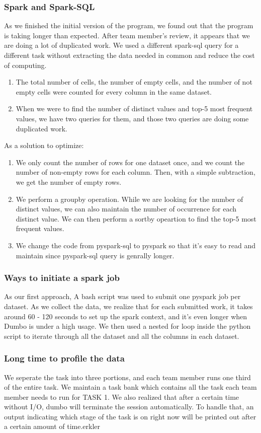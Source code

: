 \documentclass[sigconf]{acmart}
\begin{document}
\subsubsection{Spark and Spark-SQL}
As we finished the initial version of the program, we found out that the program is taking longer than expected. After team member's review, it appears that we are doing a lot of duplicated work. We used a different spark-sql query for a different task without extracting the data needed in common and reduce the cost of computing.
\begin{enumerate}
    \item The total number of cells, the number of empty cells, and the number of not empty cells were counted for every column in the same dataset.
    \item When we were to find the number of distinct values and top-5 most frequent values, we have two queries for them, and those two queries are doing some duplicated work.
\end{enumerate}
As a solution to optimize:
\begin{enumerate}
    \item We only count the number of rows for one dataset once, and we count the number of non-empty rows for each column. Then, with a simple subtraction, we get the number of empty rows.
    \item We perform a groupby operation. While we are looking for the number of distinct values, we can also maintain the number of occurrence for each distinct value. We can then perform a sortby opeartion to find the top-5 most frequent values.
    \item We change the code from pyspark-sql to pyspark so that it's easy to read and maintain since pyspark-sql query is genrally longer.
\end{enumerate}
\subsubsection{Ways to initiate a spark job}
As our first approach, A bash script was used to submit one pyspark job per dataset. As we collect the data, we realize that for each submitted work, it takes around 60 - 120 seconds to set up the spark context, and it's even longer when Dumbo is under a high usage. 
We then used a nested for loop inside the python script to iterate through all the dataset and all the columns in each dataset.
\subsubsection{Long time to profile the data}
We seperate the task into three portions, and each team member runs one third of the entire task. We maintain a task bank which contains all the task each team member needs to run for TASK 1. We also realized that after a certain time without I/O, dumbo will terminate the session automatically. To handle that, an output indicating which stage of the task is on right now will be printed out after a certain amount of time.erkler
\end{document}
